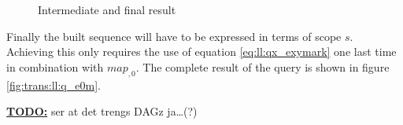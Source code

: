 \begin{figure}[!h]
\centering
{}
\qquad
{}
\qquad
{}
\label{fig:trans:ll:endExample}
\caption{Intermediate and final result}
\end{figure}

Finally the built sequence will have to be expressed in terms of scope $s$. Achieving this only requires the use
of equation \ref{eq:ll:qx_exymark} one last time in combination with $map_{ ,0}$. The complete result of the query
is shown in figure \ref{fig:trans:ll:q_e0m}.

\underline{\textbf{\LARGE TODO:}} ser at det trengs DAGz ja\ldots (?)
